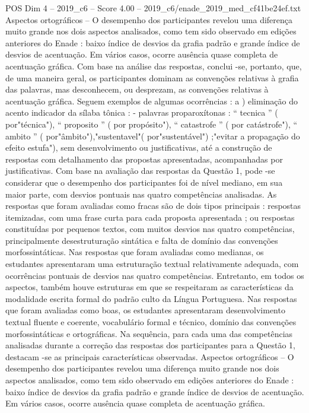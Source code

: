 \begin{textsample}{POS Dim 4 – 2019\_c6 – Score 4.00 – 2019\_c6/enade\_2019\_med\_cf41be24ef.txt}
Aspectos ortográficos – O desempenho dos participantes revelou uma diferença muito grande nos dois aspectos analisados, como tem sido observado em edições anteriores do Enade : baixo índice de desvios da grafia padrão e grande índice de desvios de acentuação.
Em vários casos, ocorre ausência quase completa de acentuação gráfica.
Com base na análise das respostas, conclui -se, portanto, que, de uma maneira geral, os participantes dominam as convenções relativas à grafia das palavras, mas desconhecem, ou desprezam, as convenções relativas à acentuação gráfica.
Seguem exemplos de algumas ocorrências : a ) eliminação do acento indicador da sílaba tônica : - palavras proparoxítonas : “ tecnica ” ( por"técnica"), “ proposito ” ( por propósito"), “ catastrofe ” ( por catástrofe"), “ ambito ” ( por"âmbito"),"sustentavel"( por"sustentável") ;"evitar a propagação do efeito estufa"), sem desenvolvimento ou justificativas, até a construção de respostas com detalhamento das propostas apresentadas, acompanhadas por justificativas.
Com base na avaliação das respostas da Questão 1, pode -se considerar que o desempenho dos participantes foi de nível mediano, em sua maior parte, com desvios pontuais nas quatro competências analisadas.
As respostas que foram avaliadas como fracas são de dois tipos principais : respostas itemizadas, com uma frase curta para cada proposta apresentada ; ou respostas constituídas por pequenos textos, com muitos desvios nas quatro competências, principalmente desestruturação sintática e falta de domínio das convenções morfossintáticas.
Nas respostas que foram avaliadas como medianas, os estudantes apresentaram uma estruturação textual relativamente adequada, com ocorrências pontuais de desvios nas quatro competências.
Entretanto, em todos os aspectos, também houve estruturas em que se respeitaram as características da modalidade escrita formal do padrão culto da Língua Portuguesa.
Nas respostas que foram avaliadas como boas, os estudantes apresentaram desenvolvimento textual fluente e coerente, vocabulário formal e técnico, domínio das convenções morfossintáticas e ortográficas.
Na sequência, para cada uma das competências analisadas durante a correção das respostas dos participantes para a Questão 1, destacam -se as principais características observadas.
Aspectos ortográficos – O desempenho dos participantes revelou uma diferença muito grande nos dois aspectos analisados, como tem sido observado em edições anteriores do Enade : baixo índice de desvios da grafia padrão e grande índice de desvios de acentuação.
Em vários casos, ocorre ausência quase completa de acentuação gráfica.

\end{textsample}

